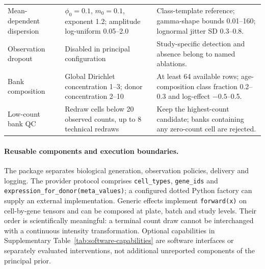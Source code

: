 \begin{longtable}{p{}p{}p{}}
Mean-dependent dispersion & $\phi_0=0.1$, $m_0=0.1$, exponent 1.2; amplitude log-uniform 0.05--2.0 & Class-template reference; gamma-shape bounds 0.01--160; lognormal jitter SD 0.3--0.8. \\
Observation dropout & Disabled in principal configuration & Study-specific detection and absence belong to named ablations. \\
Bank composition & Global Dirichlet concentration 1--3; donor concentration 2--10 & At least 64 available rows; age-composition class fraction 0.2--0.3 and log-effect $-0.5$--0.5. \\
Low-count bank QC & Redraw cells below 20 observed counts, up to 8 technical redraws & Keep the highest-count candidate; banks containing any zero-count cell are rejected. \\
\bottomrule
\end{longtable}
\endgroup

\paragraph{Reusable components and execution boundaries.}
The package separates biological generation, observation policies, delivery and logging. The provider protocol comprises \texttt{cell\_types}, \texttt{gene\_ids} and \texttt{expression\_for\_donor(meta\_values)}; a configured dotted Python factory can supply an external implementation. Generic effects implement \texttt{forward(x)} on cell-by-gene tensors and can be composed at plate, batch and study levels. Their order is scientifically meaningful: a terminal count draw cannot be interchanged with a continuous intensity transformation. Optional capabilities in Supplementary Table~\ref{tab:software-capabilities} are software interfaces or separately evaluated interventions, not additional unreported components of the principal prior.

